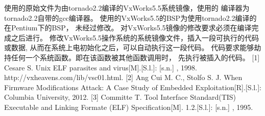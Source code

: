 \assignReq
{使用的原始文件为由tornado2.2编译的VxWorks5.5系统镜像，使用的}
{编译器为tornado2.2自带的gcc编译器。}
{使用的VxWorks5.5的BSP为使用tornado2.2编译的在Pentium下的BSP，}
{未经过修改。}
{对VxWorks5.5镜像的修改要求必须在编译完成之后进行。}
\assignWork
{修改VxWorks5.5操作系统的系统镜像文件，插入一段可执行的代码或数据,}
{从而在系统上电初始化之后，可以自动执行这一段代码。}
{代码要求能够劫持任何一个系统函数。即在该函数被其他函数调用时，}
{先执行被插入的代码。}
{}
{}
\assignRef
{[1] Cesare S. Unix ELF parasites and virus[M].[S.l.]: [s.n.] , 1998. }
{http://vxheavens.com/lib/vsc01.html.}
{[2] Ang Cui M. C., Stolfo S. J. When Firmware Modifications Attack: A Case}
{Study of Embedded Exploitation[R].[S.l.]: Columbia University, 2012.}
{[3] Committe T. Tool Interface Standard(TIS) Executable and Linking Formate}
{(ELF) Specification[M]. 1.2.[S.l.]: [s.n.] , 1995.}
{}{}
